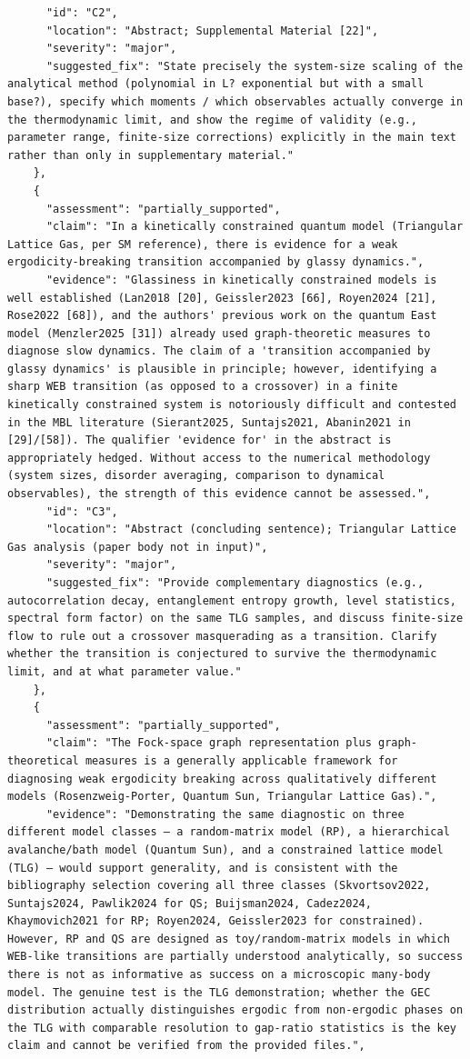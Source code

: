 \documentclass[11pt]{article}
\begin{document}
\begin{verbatim}
      "id": "C2",
      "location": "Abstract; Supplemental Material [22]",
      "severity": "major",
      "suggested_fix": "State precisely the system-size scaling of the analytical method (polynomial in L? exponential but with a small base?), specify which moments / which observables actually converge in the thermodynamic limit, and show the regime of validity (e.g., parameter range, finite-size corrections) explicitly in the main text rather than only in supplementary material."
    },
    {
      "assessment": "partially_supported",
      "claim": "In a kinetically constrained quantum model (Triangular Lattice Gas, per SM reference), there is evidence for a weak ergodicity-breaking transition accompanied by glassy dynamics.",
      "evidence": "Glassiness in kinetically constrained models is well established (Lan2018 [20], Geissler2023 [66], Royen2024 [21], Rose2022 [68]), and the authors' previous work on the quantum East model (Menzler2025 [31]) already used graph-theoretic measures to diagnose slow dynamics. The claim of a 'transition accompanied by glassy dynamics' is plausible in principle; however, identifying a sharp WEB transition (as opposed to a crossover) in a finite kinetically constrained system is notoriously difficult and contested in the MBL literature (Sierant2025, Suntajs2021, Abanin2021 in [29]/[58]). The qualifier 'evidence for' in the abstract is appropriately hedged. Without access to the numerical methodology (system sizes, disorder averaging, comparison to dynamical observables), the strength of this evidence cannot be assessed.",
      "id": "C3",
      "location": "Abstract (concluding sentence); Triangular Lattice Gas analysis (paper body not in input)",
      "severity": "major",
      "suggested_fix": "Provide complementary diagnostics (e.g., autocorrelation decay, entanglement entropy growth, level statistics, spectral form factor) on the same TLG samples, and discuss finite-size flow to rule out a crossover masquerading as a transition. Clarify whether the transition is conjectured to survive the thermodynamic limit, and at what parameter value."
    },
    {
      "assessment": "partially_supported",
      "claim": "The Fock-space graph representation plus graph-theoretical measures is a generally applicable framework for diagnosing weak ergodicity breaking across qualitatively different models (Rosenzweig-Porter, Quantum Sun, Triangular Lattice Gas).",
      "evidence": "Demonstrating the same diagnostic on three different model classes — a random-matrix model (RP), a hierarchical avalanche/bath model (Quantum Sun), and a constrained lattice model (TLG) — would support generality, and is consistent with the bibliography selection covering all three classes (Skvortsov2022, Suntajs2024, Pawlik2024 for QS; Buijsman2024, Cadez2024, Khaymovich2021 for RP; Royen2024, Geissler2023 for constrained). However, RP and QS are designed as toy/random-matrix models in which WEB-like transitions are partially understood analytically, so success there is not as informative as success on a microscopic many-body model. The genuine test is the TLG demonstration; whether the GEC distribution actually distinguishes ergodic from non-ergodic phases on the TLG with comparable resolution to gap-ratio statistics is the key claim and cannot be verified from the provided files.",

\end{verbatim}
\end{document}
